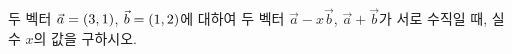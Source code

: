 두 벡터 $\vec{a}=(3{,}\mkern3mu\mathopen{}1)$, $\vec{b}=(1{,}\mkern3mu\mathopen{}2)$에 대하여 두 벡터 $\vec{a}-x\vec{b}$, $\vec{a}+\vec{b}$가 서로 수직일 때, 실수 $x$의 값을 구하시오.

